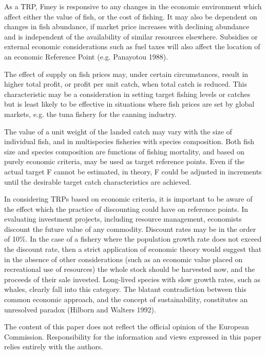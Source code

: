 \documentclass[12pt,oneline,a4paper,numbib]{ouparticle}
\numberwithin{equation}{subsection} %
\begin{document}
As a TRP, Fmey is responsive to any changes in the economic environment which affect either the value of fish, or the cost of fishing. It may also be dependent on changes in fish abundance, if market price increases with declining abundance and is independent of the availability of similar resources elsewhere. Subsidies or external economic considerations such as fuel taxes will also affect the location of an economic Reference Point (e.g. Panayotou 1988).

The effect of supply on fish prices may, under certain circumstances, result in higher total profit, or profit per unit catch, when total catch is reduced. This characteristic may be a consideration in setting target fishing levels or catches but is least likely to be effective in situations where fish prices are set by global markets, e.g. the tuna fishery for the canning industry.

The value of a unit weight of the landed catch may vary with the size of individual fish, and in multispecies fisheries with species composition. Both fish size and species composition are functions of fishing mortality, and based on purely economic criteria, may be used as target reference points. Even if the actual target F cannot be estimated, in theory, F could be adjusted in increments until the desirable target catch characteristics are achieved.

In considering TRPs based on economic criteria, it is important to be aware of the effect which the practice of discounting could have on reference points. In evaluating investment projects, including resource management, economists discount the future value of any commodity. Discount rates may be in the order of 10\%. In the case of a fishery where the population growth rate does not exceed the discount rate, then a strict application of economic theory would suggest that in the absence of other considerations (such as an economic value placed on recreational use of resources) the whole stock should be harvested now, and the proceeds of their sale invested. Long-lived species with slow growth rates, such as whales, clearly fall into this category. The blatant contradiction between this common economic approach, and the concept of sustainability, constitutes an unresolved paradox (Hilborn and Walters 1992).

\begin{notes}[Acknowledgements]
The content of this paper does not reflect the official opinion of the European Commission. Responsibility for the information and views expressed in this paper relies entirely with the authors.
\end{notes}

\newpage


\end{document}
